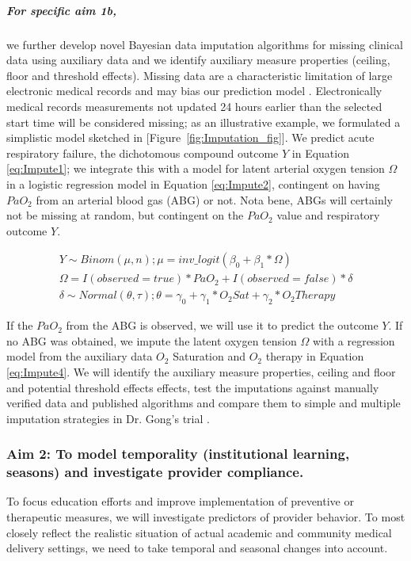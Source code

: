 \documentclass[11pt,notitlepage]{article}
\begin{document}
\subparagraph*{For specific aim 1b,} we further develop novel Bayesian data imputation algorithms for missing clinical data using auxiliary data and we identify auxiliary measure properties (ceiling, floor and threshold effects). Missing data are a characteristic limitation of large electronic medical records and may bias our prediction model \cite{Dean_19279318}. Electronically medical records measurements not updated 24 hours earlier than the selected start time will be considered missing;  as an illustrative example, we formulated a simplistic model sketched in [Figure~\ref{fig:Imputation_fig}]. We predict acute respiratory failure, the dichotomous compound outcome $Y$ in Equation \ref{eq:Impute1}; we integrate this with a model for latent arterial oxygen tension $\Omega$ in a logistic regression model in Equation \ref{eq:Impute2}, contingent on having $PaO_{2}$ from an arterial blood gas (ABG) or not. Nota bene, ABGs will certainly not be missing at random, but contingent on the $PaO_2$ value and respiratory outcome $Y$. 

\begin{figure} 
\vspace{-25pt}
\begin{align} \label{eq:Impute1}
Y \sim Binom(\mu, n); \mu = inv\_logit(\beta_{0} + \beta_{1} * \Omega) \\ \label{eq:Impute2}
\Omega =  I(observed = true) * PaO_{2}   +   I(observed = false) * \delta  \\ 
\delta \sim Normal(\theta, \tau); \theta = \gamma_{0} + \gamma_{1}* O_{2} Sat + \gamma_{2} * O_{2} Therapy \label{eq:Impute4}
\end{align}
\vspace{-35pt}
\end{figure}

\vspace{5pt} If the $PaO_{2}$ from the ABG is observed, we will use it to predict the outcome $Y$. If no ABG was obtained, we impute the latent oxygen tension $\Omega$ with a regression model from the auxiliary data  $O_{2}$ Saturation and $O_{2}$ therapy in Equation \ref{eq:Impute4}. We will identify the auxiliary measure properties, ceiling and floor and potential threshold effects effects, test the imputations against manually verified data and published algorithms and compare them to  simple and multiple imputation strategies in Dr. Gong's trial \cite{Huntington_16311133,Sloan_15027501}.  

\subsubsection*{Aim 2: To model temporality (institutional learning, seasons) and investigate provider compliance.}
To focus education efforts and improve implementation of preventive or therapeutic measures, we will investigate predictors of provider behavior. To most closely reflect the realistic situation of actual academic and community medical delivery settings, we need to take temporal and seasonal changes into account. 
  
\end{document}
